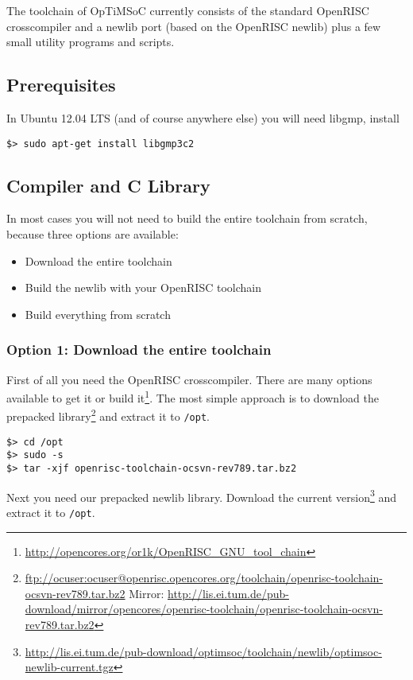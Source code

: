 The toolchain of OpTiMSoC currently consists of the standard OpenRISC
crosscompiler and a newlib port (based on the OpenRISC newlib) plus a
few small utility programs and scripts.

\subsection{Prerequisites}

In Ubuntu 12.04 LTS (and of course anywhere else) you will need
libgmp, install

\begin{verbatim}
$> sudo apt-get install libgmp3c2
\end{verbatim}

\subsection{Compiler and C Library}

In most cases you will not need to build the entire toolchain from
scratch, because three options are available:

\begin{itemize}
\item Download the entire toolchain
\item Build the newlib with your OpenRISC toolchain
\item Build everything from scratch 
\end{itemize}


\subsubsection{Option 1: Download the entire toolchain}
First of all you need the OpenRISC crosscompiler. There are many
options available to get it or build it\footnote{\url{http://opencores.org/or1k/OpenRISC_GNU_tool_chain}}. The most simple
approach is to download the prepacked
library\footnote{\url{ftp://ocuser:ocuser@openrisc.opencores.org/toolchain/openrisc-toolchain-ocsvn-rev789.tar.bz2}
Mirror: \url{http://lis.ei.tum.de/pub-download/mirror/opencores/openrisc-toolchain/openrisc-toolchain-ocsvn-rev789.tar.bz2}} and extract it
to \verb|/opt|.

\begin{verbatim}
$> cd /opt
$> sudo -s
$> tar -xjf openrisc-toolchain-ocsvn-rev789.tar.bz2
\end{verbatim}

Next you need our prepacked newlib library. Download the current
version\footnote{\url{http://lis.ei.tum.de/pub-download/optimsoc/toolchain/newlib/optimsoc-newlib-current.tgz}}
and extract it to \verb|/opt|.

